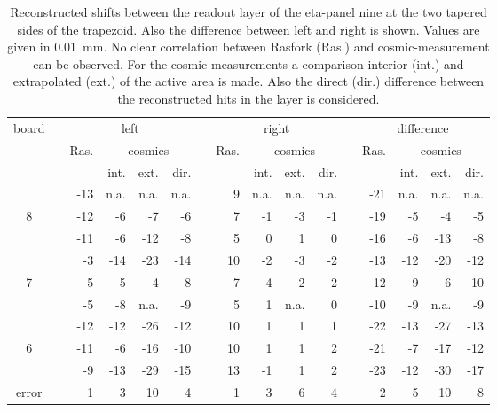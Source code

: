 \documentclass[
twoside,            %
BCOR1.4cm,          %
10pt,               %
headings=normal,    %
headsepline,        %
clearplainpage,		%
final,              %
div=14,
open=right,
bibliography=toc
]{scrreprt}
\begin{document}
\begin{table}[!h]
	\centering	
	\begin{tabular}{ccrrrrcrrrrcrrrr}
		\hline
		\hline
		board & \hspace{1mm} & \multicolumn{4}{c}{left} & \hspace{1mm} & \multicolumn{4}{c}{right} & \hspace{1mm} & \multicolumn{4}{c}{difference}
		\\
		 & & Ras. & \multicolumn{3}{c}{cosmics} & & Ras. & \multicolumn{3}{c}{cosmics} & & Ras. & \multicolumn{3}{c}{cosmics}
		\\
	 	 & &       & int. & ext. & dir. & &      & int. & ext. & dir. & &      & int. & ext. & dir.
 		\\
		\hline
		  & &  -13 & n.a. & n.a. & n.a. & &    9 & n.a. & n.a. & n.a. & &  -21 & n.a. & n.a. & n.a.
		\\
		8 & &  -12 &   -6 &   -7 &   -6 & &    7 &   -1 &   -3 &   -1 & &  -19 &   -5 &   -4 &   -5
		\\
		  & &  -11 &   -6 &  -12 &   -8 & &    5 &    0 &    1 &    0 & &  -16 &   -6 &  -13 &   -8
		\\
		\hline
		  & &   -3 &  -14 &  -23 &  -14 & &   10 &   -2 &   -3 &   -2 & &  -13 &  -12 &  -20 &  -12
		\\
		7 & &   -5 &   -5 &   -4 &   -8 & &    7 &   -4 &   -2 &   -2 & &  -12 &   -9 &   -6 &  -10
		\\
		  & &   -5 &   -8 & n.a. &   -9 & &    5 &    1 & n.a. &    0 & &  -10 &   -9 & n.a. &   -9
		\\
		\hline
		  & &  -12 &  -12 &  -26 &  -12 & &   10 &    1 &    1 &    1 & &  -22 &  -13 &  -27 &  -13
		\\
		6 & &  -11 &   -6 &  -16 &  -10 & &   10 &    1 &    1 &    2 & &  -21 &   -7 &  -17 &  -12
		\\
		  & &   -9 &  -13 &  -29 &  -15 & &   13 &   -1 &    1 &    2 & &  -23 &  -12 &  -30 &  -17
 		\\
	 	\hline
	 	error & & 1 & 3 & 10 & 4 & & 1 & 3 & 6 & 4 & & 2 & 5 & 10 & 8
 		\\
	 	\hline
		\hline
	\end{tabular}
	\caption{
		Reconstructed shifts between the readout layer of the eta-panel nine at the two tapered sides of the trapezoid.
		Also the difference between left and right is shown.
		Values are given in \SI{0.01}{mm}.
		No clear correlation between Rasfork (Ras.) and cosmic-measurement can be observed.
		For the cosmic-measurements a comparison interior (int.) and extrapolated (ext.) of the active area is made.
		Also the direct (dir.) difference between the reconstructed hits in the layer is considered.
	}
	\label{eta9reconstructedShifts}
\end{table}
\end{document}
